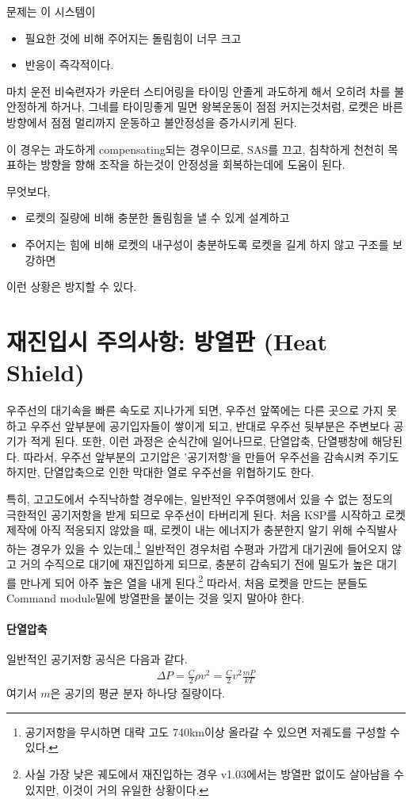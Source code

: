 \documentclass[9pt]{amsbook}
\begin{document}
문제는 이 시스템이
\begin{itemize}
\item 필요한 것에 비해 주어지는 돌림힘이 너무 크고
\item 반응이 즉각적이다.
\end{itemize}
마치 운전 비숙련자가 카운터 스티어링을 타이밍 안졸게 과도하게 해서 오히려 차를 불안정하게 하거나, 그네를 타이밍좋게 밀면 왕복운동이 점점 커지는것처럼, 로켓은 바른 방향에서 점점 멀리까지 운동하고 불안정성을 증가시키게 된다.

이 경우는 과도하게 compensating되는 경우이므로, SAS를 끄고, 침착하게 천천히 목표하는 방향을 향해 조작을 하는것이 안정성을 회복하는데에 도움이 된다. 

무엇보다, 
\begin{itemize}
\item 로켓의 질량에 비해 충분한 돌림힘을 낼 수 있게 설계하고
\item 주어지는 힘에 비해 로켓의 내구성이 충분하도록 로켓을 길게 하지 않고 구조를 보강하면
\end{itemize}
이런 상황은 방지할 수 있다.

\section{재진입시 주의사항: 방열판 (Heat Shield)}
우주선의 대기속을 빠른 속도로 지나가게 되면, 우주선 앞쪽에는 다른 곳으로 가지 못하고 우주선 앞부분에 공기입자들이 쌓이게 되고, 반대로 우주선 뒷부분은 주변보다 공기가 적게 된다. 또한, 이런 과정은 순식간에 일어나므로, 단열압축, 단열팽창에 해당된다. 따라서, 우주선 앞부분의 고기압은 '공기저항'을 만들어 우주선을 감속시켜 주기도 하지만, 단열압축으로 인한 막대한 열로 우주선을 위협하기도 한다.

특히, 고고도에서 수직낙하할 경우에는, 
일반적인 우주여행에서 있을 수 없는 정도의 극한적인 공기저항을 받게 되므로 우주선이 타버리게 된다. 
처음 KSP를 시작하고 로켓제작에 아직 적응되지 않았을 때, 
로켓이 내는 에너지가 충분한지 알기 위해 수직발사 하는 경우가 
있을 수 있는데,\footnote{공기저항을 무시하면 대략 고도 740km이상 올라갈 수 있으면 저궤도를 구성할 수 있다.}
일반적인 경우처럼 수평과 가깝게 대기권에 들어오지 않고 거의 수직으로 대기에 재진입하게 되므로,
충분히 감속되기 전에 밀도가 높은 대기를 만나게 되어 아주 높은 열을 
내게 된다.\footnote{사실 가장 낮은 궤도에서 재진입하는 경우 v1.03에서는 방열판 없이도 살아남을 수 있지만, 
이것이 거의 유일한 상황이다.} 
따라서, 처음 로켓을 만드는 분들도 Command module밑에 방열판을 붙이는 것을 잊지 말아야 한다.

\paragraph{단열압축}
일반적인 공기저항 공식은 다음과 같다.
\begin{align}
\Delta P = \frac{C}{2} \rho v^2 = \frac{C}{2} v^2\frac{m P}{kT}
\end{align}
여기서 $m$은 공기의 평균 분자 하나당 질량이다.
\end{document}
